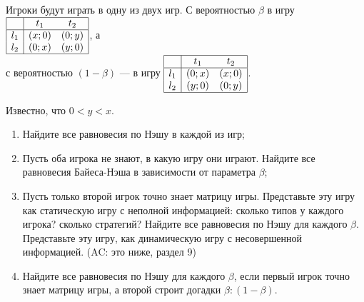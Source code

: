 \begin{problem}\par
\begin{source}\cite{polisci:lectures} \end{source}
Игроки будут играть в одну из двух игр.
С вероятностью  $\beta $ в игру  $\begin{array}{|c|cc|}  \hline {} & {t_{1} } & {t_{2} } \\  \hline {l_{1} } & {\left(x;0\right)} & {\left(0;y\right)} \\ {l_{2} } & {\left(0;x\right)} & {\left(y;0\right)} \\  \hline  \end{array}$, а  \\
с вероятностью  $\left(1-\beta \right)$  — в игру  $\begin{array}{|c|cc|}  \hline {} & {t_{1} } & {t_{2} } \\  \hline {l_{1} } & {\left(0;x\right)} & {\left(x;0\right)} \\ {l_{2} } & {\left(y;0\right)} & {\left(0;y\right)} \\  \hline  \end{array}$.

Известно, что  $0<y<x$.\par
\begin{enumerate}
\item	Найдите все равновесия по Нэшу в каждой из игр;\par
\item 	Пусть оба игрока не знают, в какую игру они играют. Найдите все равновесия Байеса-Нэша в зависимости от параметра  $\beta$;\par
\item 	Пусть только второй игрок точно знает матрицу игры. Представьте эту игру как статическую игру с неполной информацией: сколько типов у каждого игрока? сколько стратегий? Найдите все равновесия по Нэшу для каждого  $\beta $. Представьте эту игру, как динамическую игру с несовершенной информацией. ({\red AC: это ниже, раздел 9})\par
\item	Найдите все равновесия по Нэшу для каждого  $\beta $, если первый игрок точно знает матрицу игры, а второй строит догадки $\beta: (1-\beta)$.\par
\end{enumerate}


\begin{sol}

\end{sol}
\end{problem}



